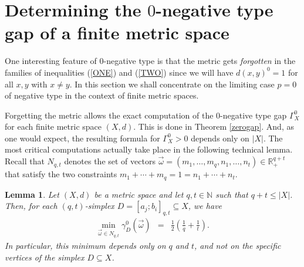 \documentclass[10pt]{amsart}
\newtheorem{lem}[thm]{Lemma}
\theoremstyle{definition}
\theoremstyle{remark}
\begin{document}
\section{Determining the $0$-negative type gap of a finite metric space}
One interesting feature of $0$-negative type is that the metric gets
\textit{forgotten} in the families of inequalities (\ref{ONE}) and (\ref{TWO}) since we will have
$d(x,y)^{0} = 1$ for all $x,y$ with $x \not=y$.
In this section we shall concentrate on the limiting case $p=0$ of negative type in the context of
finite metric spaces.

Forgetting the metric allows the exact computation
of the $0$-negative type gap $\Gamma_{X}^{0}$ for each finite metric space $(X,d)$.
This is done in Theorem \ref{zerogap}.
And, as one would expect, the resulting formula for $\Gamma_{X}^{0} > 0$ depends only on $|X|$.
The most critical computations actually take place in
the following technical lemma. Recall that $N_{q,t}$
denotes the set of vectors $\vec{\omega} = (m_{1}, \ldots, m_{q}, n_{1}, \ldots, n_{t}) \in
\mathbb{R}_{+}^{q+t}$ that satisfy the two constraints $m_{1} + \cdots + m_{q} = 1 =
n_{1} + \cdots + n_{t}$.

\begin{lem}\label{techlem}
Let $(X,d)$ be a metric space and let $q,t \in \mathbb{N}$ such that $q+t \leq |X|$.
Then, for each $(q,t)$-simplex $D=[a_{j};b_{i}]_{q,t} \subseteq X$, we have
\begin{eqnarray*}
\min\limits_{\vec{\omega} \in N_{q,t}} \gamma_{D}^{0}(\vec{\omega})
& = & \frac{1}{2} \left( \frac{1}{q} + \frac{1}{t} \right).
\end{eqnarray*}
In particular, this minimum depends only on $q$ and $t$, and not on the specific vertices
of the simplex $D \subseteq X$.
\end{lem}
\end{document}
